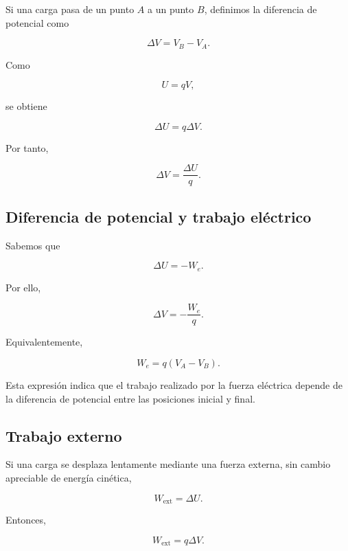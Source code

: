 Si una carga pasa de un punto \(A\) a un punto \(B\), definimos la diferencia de
potencial como

\begin{equation}
\boxed{
\Delta V=V_B-V_A
}.
\end{equation}

Como

\[
U=qV,
\]

se obtiene

\begin{equation}
\boxed{
\Delta U=q\Delta V
}.
\end{equation}

Por tanto,

\begin{equation}
\boxed{
\Delta V=\frac{\Delta U}{q}
}.
\end{equation}


\subsection{Diferencia de potencial y trabajo eléctrico}

Sabemos que

\[
\Delta U=-W_e.
\]

Por ello,

\begin{equation}
\boxed{
\Delta V=-\frac{W_e}{q}
}.
\end{equation}

Equivalentemente,

\begin{equation}
\boxed{
W_e=q(V_A-V_B)
}.
\end{equation}

Esta expresión indica que el trabajo realizado por la fuerza eléctrica depende de la
diferencia de potencial entre las posiciones inicial y final.


\subsection{Trabajo externo}

Si una carga se desplaza lentamente mediante una fuerza externa, sin cambio apreciable
de energía cinética,

\[
W_{\text{ext}}=\Delta U.
\]

Entonces,

\begin{equation}
\boxed{
W_{\text{ext}}=q\Delta V
}.
\end{equation}



